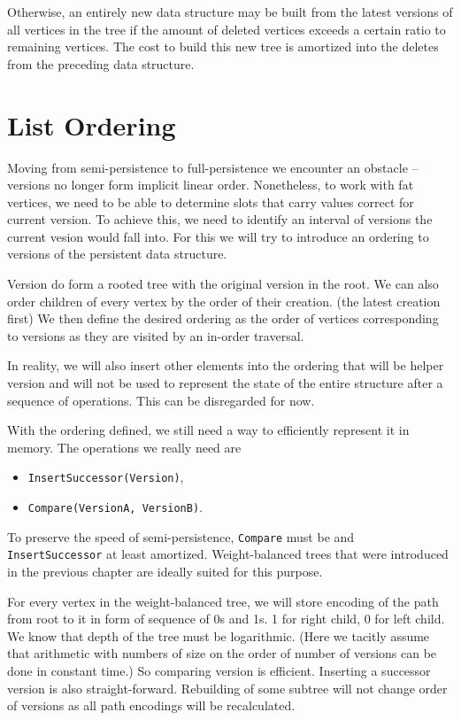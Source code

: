 Otherwise, an entirely new data structure may be built from the latest versions of all vertices in the tree if the amount of deleted vertices exceeds a certain ratio to remaining vertices. The cost to build this new tree is amortized into the deletes from the preceding data structure.



\section{List Ordering}

Moving from semi-persistence to full-persistence we encounter an obstacle -- versions no longer form implicit linear order. Nonetheless, to work with fat vertices, we need to be able to determine slots that carry values correct for current version. To achieve this, we need to identify an interval of versions the current vesion would fall into. For this we will try to introduce an ordering to versions of the persistent data structure.

Version do form a rooted tree with the original version in the root. We can also order children of every vertex by the order of their creation. (the latest creation first) We then define the desired ordering as the order of vertices corresponding to versions as they are visited by an in-order traversal.

In reality, we will also insert other elements into the ordering that will be helper version and will not be used to represent the state of the entire structure after a sequence of operations. This can be disregarded for now.

With the ordering defined, we still need a way to efficiently represent it in memory. The operations we really need are

\begin{itemize}
	\item \texttt{InsertSuccessor(Version)},
	\item \texttt{Compare(VersionA, VersionB)}.
\end{itemize}

To preserve the speed of semi-persistence, \texttt{Compare} must be  and \texttt{InsertSuccessor}  at least amortized. Weight-balanced trees that were introduced in the previous chapter are ideally suited for this purpose.

For every vertex in the weight-balanced tree, we will store encoding of the path from root to it in form of sequence of 0s and 1s. 1 for right child, 0 for left child. We know that depth of the tree must be logarithmic. (Here we tacitly assume that arithmetic with numbers of size on the order of number of versions can be done in constant time.) So comparing version is efficient. Inserting a successor version is also straight-forward. Rebuilding of some subtree will not change order of versions as all path encodings will be recalculated.

